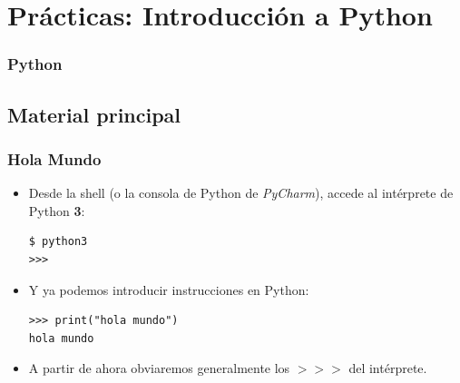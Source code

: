 


\section{Prácticas: Introducción a Python}


\begin{frame}
\frametitle{Python}

\end{frame}
\usebackgroundtemplate{}


\subsection{Material principal}


\begin{frame}[fragile]

\frametitle{Hola Mundo}

\begin{itemize}
\item Desde la shell (o la consola de Python de \emph{PyCharm}), accede al intérprete de Python {\bf 3}:

\begin{footnotesize}
\begin{verbatim}
$ python3
>>>
\end{verbatim}
\end{footnotesize}
\item Y ya podemos introducir instrucciones en Python:

\begin{footnotesize}
\begin{verbatim}
>>> print("hola mundo")
hola mundo
\end{verbatim}
\end{footnotesize}

\item A partir de ahora obviaremos generalmente los $>>>$ del intérprete.

\end{itemize}

\end{frame}

